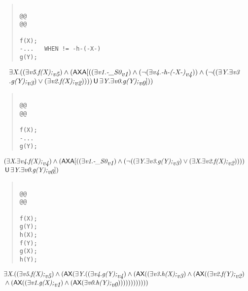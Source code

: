 \documentclass{article}
\newcommand{\U}{\,\mbox{\sf{U}}\,}
\newcommand{\A}{\mbox{\sf{A}}}
\newcommand{\AX}{\mbox{\sf{AX}}}
\newcommand{\mita}[1]{\mbox{\it{{#1}}}}
\begin{document}
\begin{quote}\begin{verbatim}

@@
@@

f(X);
-...   WHEN != -h-(-X-)
g(Y);
\end{verbatim}\end{quote}

\[\begin{array}{l}
\exists \mita{X} . ((\exists \mita{v5} . \mita{f(X);}_{\mita{v5}}) \wedge (\AX\A[((\exists \mita{v1} . \mita{-\_S0}_{\mita{v1}}) \wedge (\neg (\exists \mita{v4} . \mita{-h-(-X-)}_{\mita{v4}})) \wedge (\neg ((\exists \mita{Y} . \exists \mita{v3}\\\mbox{} . \mita{g(Y);}_{\mita{v3}}) \vee (\exists \mita{v2} . \mita{f(X);}_{\mita{v2}})))) \U \exists \mita{Y} . \exists \mita{v0} . \mita{g(Y);}_{\mita{v0}}]
))
\end{array}\]

\begin{quote}\begin{verbatim}

@@
@@

f(X);
-...
g(Y);
\end{verbatim}\end{quote}

\[\begin{array}{l}
(\exists \mita{X} . \exists \mita{v4} . \mita{f(X);}_{\mita{v4}}) \wedge (\AX\A[((\exists \mita{v1} . \mita{-\_S0}_{\mita{v1}}) \wedge (\neg ((\exists \mita{Y} . \exists \mita{v3} . \mita{g(Y);}_{\mita{v3}}) \vee (\exists \mita{X} . \exists \mita{v2} . \mita{f(X);}_{\mita{v2}}))))\\\mbox{} \U \exists \mita{Y} . \exists \mita{v0} . \mita{g(Y);}_{\mita{v0}}]
)
\end{array}\]

\begin{quote}\begin{verbatim}

@@
@@

f(X);
g(Y);
h(X);
f(Y);
g(X);
h(Y);
\end{verbatim}\end{quote}

\[\begin{array}{l}
\exists \mita{X} . ((\exists \mita{v5} . \mita{f(X);}_{\mita{v5}}) \wedge (\AX(\exists \mita{Y} . ((\exists \mita{v4} . \mita{g(Y);}_{\mita{v4}}) \wedge (\AX((\exists \mita{v3} . \mita{h(X);}_{\mita{v3}}) \wedge (\AX((\exists \mita{v2} . \mita{f(Y);}_{\mita{v2}})\\\mbox{} \wedge (\AX((\exists \mita{v1} . \mita{g(X);}_{\mita{v1}}) \wedge (\AX(\exists \mita{v0} . \mita{h(Y);}_{\mita{v0}}))))))))))))
\end{array}\]
\end{document}
